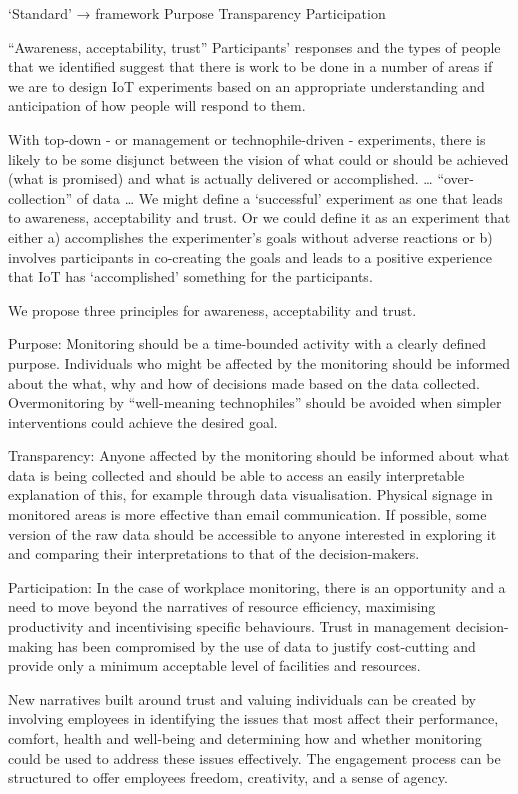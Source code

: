 ‘Standard’ → framework
Purpose
Transparency
Participation

“Awareness, acceptability, trust”
Participants’ responses and the types of people that we identified suggest that there is work to be done in a number of areas if we are to design IoT experiments based on an appropriate understanding and anticipation of how people will respond to them.

With top-down - or management or technophile-driven - experiments, there is likely to be some disjunct between the vision of what could or should be achieved (what is promised) and what is actually delivered or accomplished. … “over-collection” of data
…
We might define a ‘successful’ experiment as one that leads to awareness, acceptability and trust. Or we could define it as an experiment that either a) accomplishes the experimenter’s goals without adverse reactions or b) involves participants in co-creating the goals and leads to a positive experience that IoT has ‘accomplished’ something for the participants. 

We propose three principles for awareness, acceptability and trust.

Purpose: Monitoring should be a time-bounded activity with a clearly defined purpose. Individuals who might be affected by the monitoring should be informed about the what, why and how of decisions made based on the data collected. Overmonitoring by “well-meaning technophiles” should be avoided when simpler interventions could achieve the desired goal.

Transparency: Anyone affected by the monitoring should be informed about what data is being collected and should be able to access an easily interpretable explanation of this, for example through data visualisation. Physical signage in monitored areas is more effective than email communication. If possible, some version of the raw data should be accessible to anyone interested in exploring it and comparing their interpretations to that of the decision-makers.

Participation: In the case of workplace monitoring, there is an opportunity and a need to move beyond the narratives of resource efficiency, maximising productivity and incentivising specific behaviours. Trust in management decision-making has been compromised by the use of data to justify cost-cutting and provide only a minimum acceptable level of facilities and resources.

New narratives built around trust and valuing individuals can be created by involving employees in identifying the issues that most affect their performance, comfort, health and well-being and determining how and whether monitoring could be used to address these issues effectively. The engagement process can be structured to offer employees freedom, creativity, and a sense of agency.

